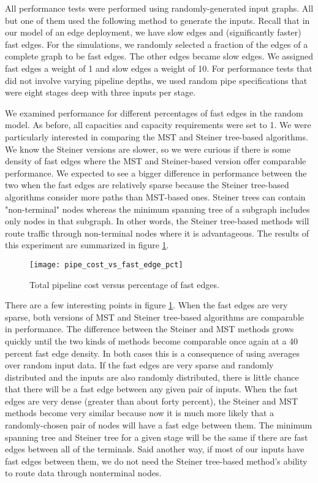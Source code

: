 \documentclass[conference]{IEEEtran}
\begin{document}
	All performance tests were performed using randomly-generated input graphs. All but one of them used the following method to generate the inputs. Recall that in our model of an edge deployment, we have slow edges and (significantly faster) fast edges. For the simulations, we randomly selected a fraction of the edges of a complete graph to be fast edges. The other edges became slow edges. We assigned fast edges a weight of 1 and slow edges a weight of 10. For performance tests that did not involve varying pipeline depths, we used random pipe specifications that were eight stages deep with three inputs per stage.
	
	We examined performance for different percentages of fast edges in the random model. As before, all capacities and capacity requirements were set to 1. We were particularly interested in comparing the MST and Steiner tree-based algorithms. We know the Steiner versions are slower, so we were curious if there is some density of fast edges where the MST and Steiner-based version offer comparable performance. We expected to see a bigger difference in performance between the two when the fast edges are relatively sparse because the Steiner tree-based algorithms consider more paths than MST-based ones. Steiner trees can contain "non-terminal" nodes whereas the minimum spanning tree of a subgraph includes only nodes in that subgraph.  In other words, the Steiner tree-based methods will route traffic through non-terminal nodes where it is advantageous. The results of this experiment are summarized in figure \ref{fig:perf_fe}.
	\begin{figure}[t]
	    \centering
	    \texttt{[image: pipe\_cost\_vs\_fast\_edge\_pct]}
	    \caption{Total pipeline cost versus percentage of fast edges.}
	    \label{fig:perf_fe}
	\end{figure}
	
	There are a few interesting points in figure \ref{fig:perf_fe}. When the fast edges are very sparse, both versions of MST and Steiner tree-based algorithms are comparable in performance. The difference between the Steiner and MST methods grows quickly until the two kinds of methods become comparable once again at a 40 percent fast edge density. In both cases this is a consequence of using averages over random input data. If the fast edges are very sparse and randomly distributed and the inputs are also randomly distributed, there is little chance that there will be a fast edge between any given pair of inputs. When the fast edges are very dense (greater than about forty percent), the Steiner and MST methods become very similar because now it is much more likely that a randomly-chosen pair of nodes will have a fast edge between them. The minimum spanning tree and Steiner tree for a given stage will be the same if there are fast edges between all of the terminals. Said another way, if most of our inputs have fast edges between them, we do not need the Steiner tree-based method's ability to route data through nonterminal nodes.
	
\end{document}
